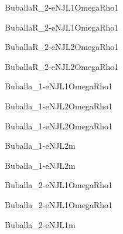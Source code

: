 \documentclass[prc, reprint, amsmath, linenumbers,10pt]{revtex4-1}
\begin{document}
\begin{figure}
	
	\caption{BuballaR\_2-eNJL1OmegaRho1}
\end{figure}
\begin{figure}
	
	\caption{BuballaR\_2-eNJL1OmegaRho1}
\end{figure}
\begin{figure}
	
	\caption{BuballaR\_2-eNJL2OmegaRho1}
\end{figure}
\begin{figure}
	
	\caption{BuballaR\_2-eNJL2OmegaRho1}
\end{figure}
\begin{figure}
	
	\caption{Buballa\_1-eNJL1OmegaRho1}
\end{figure}
\begin{figure}
	
	\caption{Buballa\_1-eNJL2OmegaRho1}
\end{figure}
\begin{figure}
	
	\caption{Buballa\_1-eNJL2OmegaRho1}
\end{figure}
\begin{figure}
	
	\caption{Buballa\_1-eNJL2m}
\end{figure}
\begin{figure}
	
	\caption{Buballa\_1-eNJL2m}
\end{figure}
\begin{figure}
	
	\caption{Buballa\_2-eNJL1OmegaRho1}
\end{figure}
\begin{figure}
	
	\caption{Buballa\_2-eNJL1OmegaRho1}
\end{figure}
\begin{figure}
	
	\caption{Buballa\_2-eNJL1m}
\end{figure}
\end{document}
